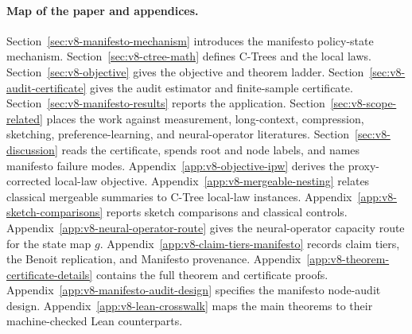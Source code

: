 \paragraph{Map of the paper and appendices.}
Section~\ref{sec:v8-manifesto-mechanism} introduces the manifesto
policy-state mechanism. Section~\ref{sec:v8-ctree-math} defines
C-Trees and the local laws. Section~\ref{sec:v8-objective} gives the
objective and theorem ladder. Section~\ref{sec:v8-audit-certificate}
gives the audit estimator and finite-sample certificate.
Section~\ref{sec:v8-manifesto-results} reports the application.
Section~\ref{sec:v8-scope-related} places the work against
measurement, long-context, compression, sketching,
preference-learning, and neural-operator literatures.
Section~\ref{sec:v8-discussion} reads the certificate, spends root
and node labels, and names manifesto failure modes.
Appendix~\ref{app:v8-objective-ipw} derives the proxy-corrected
local-law objective.
Appendix~\ref{app:v8-mergeable-nesting} relates classical mergeable
summaries to C-Tree local-law instances.
Appendix~\ref{app:v8-sketch-comparisons} reports sketch comparisons
and classical controls.
Appendix~\ref{app:v8-neural-operator-route} gives the
neural-operator capacity route for the state map \(g\).
Appendix~\ref{app:v8-claim-tiers-manifesto} records claim tiers, the
Benoit replication, and Manifesto provenance.
Appendix~\ref{app:v8-theorem-certificate-details} contains the full
theorem and certificate proofs.
Appendix~\ref{app:v8-manifesto-audit-design} specifies the manifesto
node-audit design.
Appendix~\ref{app:v8-lean-crosswalk} maps the main theorems to their
machine-checked Lean counterparts.
